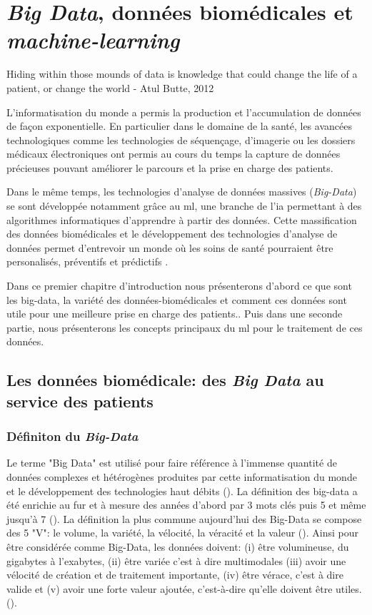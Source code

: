 \chapter{ \textit{Big Data}, données biomédicales et \textit{machine-learning}}

Hiding within those mounds of data is knowledge that could change the life of a patient, or change the world
- Atul Butte, 2012

L'informatisation du monde a permis la production et l'accumulation de données de façon exponentielle. En particulier dans le domaine de la santé, les avancées technologiques comme les technologies de séquençage, d'imagerie ou les dossiers médicaux électroniques ont permis au cours du temps la capture de données précieuses pouvant améliorer le parcours et la prise en charge des patients.

Dans le même temps, les technologies d'analyse de données massives (\textit{Big-Data}) se sont développée notamment grâce au \gls{ml}, une branche de l'\gls{ia} permettant à des algorithmes informatiques d'apprendre à partir des données. Cette massification des données biomédicales et le développement des technologies d'analyse de données permet d'entrevoir un monde où les soins de santé pourraient être personalisés, préventifs et prédictifs .

Dans ce premier chapitre d'introduction nous présenterons d'abord ce que sont les big-data, la variété des données-biomédicales et comment ces données sont utile pour une meilleure prise en charge des patients.. Puis dans une seconde partie, nous présenterons les concepts principaux du \gls{ml} pour le traitement de ces données.

\section{Les données biomédicale: des \textit{Big Data} au service des patients}

\subsection{Définiton du \textit{Big-Data}}

Le terme "Big Data" est utilisé pour faire référence à l'immense quantité de données complexes et hétérogènes produites par cette informatisation du monde et le développement des technologies haut débits (\cite{de_mauro_formal_2016}). La définition des big-data a été enrichie au fur et à mesure des années d'abord par 3 mots clés puis 5 et même jusqu'à 7 (\cite{garcia_what_2022}). La définition la plus commune aujourd'hui des Big-Data se compose des 5 "V": le volume, la variété, la vélocité, la véracité et la valeur (\cite{ishwarappa_brief_2015}). Ainsi pour être considérée comme Big-Data, les données doivent: (i) être volumineuse, du gigabytes à l'exabytes, (ii) être variée c'est à dire multimodales (iii) avoir une vélocité de création et de traitement importante, (iv) être vérace, c'est à dire valide et (v) avoir une forte valeur ajoutée, c'est-à-dire qu'elle doivent être utiles. (\cite{garcia_what_2022}).

